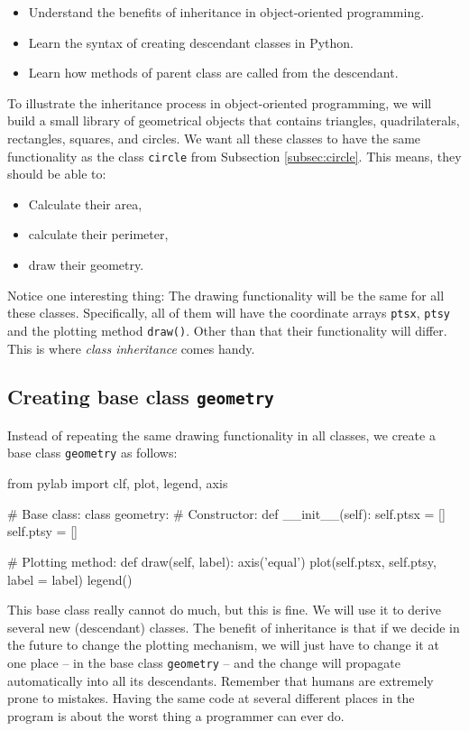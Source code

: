 \begin{itemize}
\item Understand the benefits of inheritance in object-oriented programming.
\item Learn the syntax of creating descendant classes in Python.
\item Learn how methods of parent class are called from the descendant. 
\end{itemize}
To illustrate the inheritance process in object-oriented programming, we will
build a small library of geometrical objects that contains 
triangles, quadrilaterals, rectangles, squares, and circles. 
We want all 
these classes to have the same functionality as the class {\tt circle} from 
Subsection \ref{subsec:circle}. This means, they should be able to:
\begin{itemize}
\item Calculate their area,
\item calculate their perimeter,
\item draw their geometry.
\end{itemize}
Notice one interesting thing: The drawing functionality will be 
the same for all these classes. Specifically, all of them will have the coordinate 
arrays {\tt ptsx}, {\tt ptsy} and the plotting method {\tt draw()}. Other than 
that their functionality will differ. This is where {\em class inheritance} comes
handy.

\subsection{Creating base class {\tt geometry}}

Instead of repeating the same drawing functionality in all classes, we create 
a base class {\tt geometry} as follows:

\begin{bluecode}
from pylab import clf, plot, legend, axis

# Base class:
class geometry:
    # Constructor:
    def __init__(self):
        self.ptsx = []
        self.ptsy = []
      
    # Plotting method:
    def draw(self, label):
        axis('equal')
        plot(self.ptsx, self.ptsy, label = label)
        legend()
\end{bluecode}
This base class really cannot do much, but this is fine. We will use it to 
derive several new (descendant) classes. The benefit of inheritance is that if 
we decide in the future to change the plotting mechanism, we will just have to change it at 
one place -- in the base class {\tt geometry} -- and the change will propagate automatically 
into all its descendants. Remember that humans are extremely prone to mistakes. Having the 
same code at several different places in the program is about the worst thing a programmer 
can ever do. 

